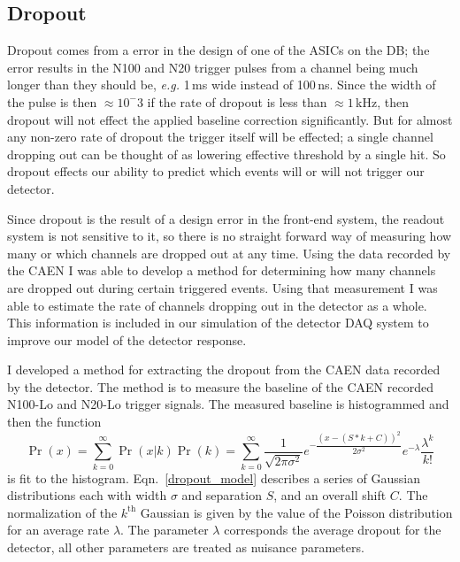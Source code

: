 \subsection{Dropout}
\label{sec:dropout}
Dropout comes from a error in the design of one of the
ASICs on the DB; the error results in the N100 and N20 trigger pulses from
a channel being much longer than they should be, \textit{e.g.} 1\,ms wide
instead of 100\,ns.
Since the width of the pulse is then $\approx10^-3$ if the rate of dropout is
less than $\approx 1$\,kHz, then dropout will not effect the applied baseline
correction significantly.
But for almost any non-zero rate of dropout  the trigger itself will be effected;
a single channel dropping out can be thought of as lowering effective threshold
by a single hit.
So dropout effects our ability to predict which events will or will not
trigger our detector.

Since dropout is the result of a design error in the front-end system, the readout system
is not sensitive to it, so there is no straight forward way of measuring how many
or which channels are dropped out at any time.
Using the data recorded by the CAEN I was able to develop a method for determining
how many channels are dropped out during certain triggered events.
Using that measurement I was able to estimate the rate of channels dropping out
in the detector as a whole.
This information is included in our simulation of the detector DAQ system to improve
our model of the detector response.

I developed a method for extracting the dropout from the CAEN data
recorded by the detector.
The method is to measure the baseline of the CAEN recorded N100-Lo and N20-Lo
trigger signals.
The measured baseline is histogrammed and then the function
\begin{equation}
    \Pr(x) = \sum_{k=0}^{\infty}\Pr(x | k)\Pr(k) = \sum_{k=0}^{\infty} \dfrac{1}{\sqrt{2 \pi \sigma^2}} e^{-\dfrac{(x - (S*k + C))^2}{2 \sigma^2}} e^{-\lambda}\dfrac{\lambda^{k}}{k!}
    \label{dropout_model}
\end{equation}
is fit to the histogram. Eqn.~\ref{dropout_model} describes a series of Gaussian
distributions each with width $\sigma$ and separation $S$, and an overall shift $C$.
The normalization of the $k^{\text{th}}$ Gaussian is given by the value of the Poisson
distribution for an average rate $\lambda$.
The parameter $\lambda$ corresponds the average dropout for the detector, all
other parameters are treated as nuisance parameters.

